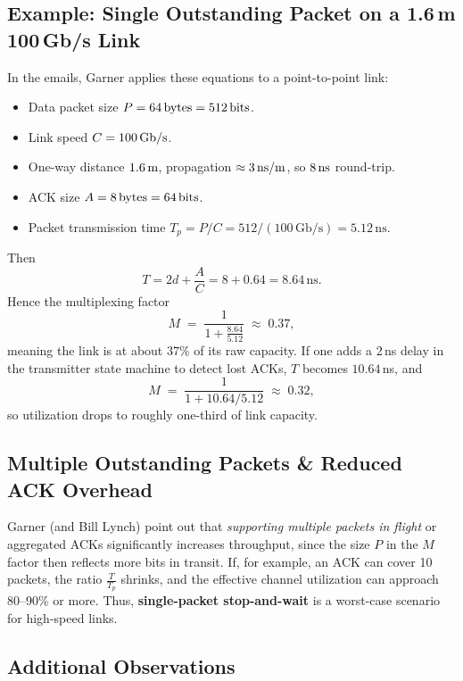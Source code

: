 \subsection{Example: Single Outstanding Packet on a 1.6\,m 100\,Gb/s Link}

In the emails, Garner applies these equations to a point-to-point link:
\begin{itemize}
\item Data packet size $P = 64\text{\,bytes} = 512\text{\,bits}$.
\item Link speed $C = 100\text{\,Gb/s}$.
\item One-way distance $1.6\text{\,m}$, propagation $\approx 3\text{\,ns/m}$, so $8\text{\,ns}$ round-trip.
\item ACK size $A = 8\text{\,bytes} = 64\text{\,bits}$.
\item Packet transmission time $T_p = P/C = 512 / (100\,\text{Gb/s}) = 5.12\,\text{ns}$.
\end{itemize}

Then
\[
  T = 2d + \frac{A}{C} = 8 + 0.64 = 8.64\,\text{ns}.
\]
Hence the multiplexing factor
\[
  M \;=\; \frac{1}{1 + \frac{8.64}{5.12}} \;\approx\; 0.37,
\]
meaning the link is at about $37\%$ of its raw capacity. If one adds a 2\,ns delay in the transmitter state machine to detect lost ACKs, $T$ becomes $10.64$\,ns, and
\[
  M \;=\; \frac{1}{1 + 10.64/5.12} \;\approx\; 0.32,
\]
so utilization drops to roughly one-third of link capacity.

\subsection{Multiple Outstanding Packets \& Reduced ACK Overhead}

Garner (and Bill Lynch) point out that \emph{supporting multiple packets in flight} or aggregated ACKs significantly increases throughput, since the size $P$ in the $M$ factor then reflects more bits in transit. If, for example, an ACK can cover 10 packets, the ratio $\frac{T}{T_p}$ shrinks, and the effective channel utilization can approach 80--90\% or more. Thus, \textbf{single-packet stop-and-wait} is a worst-case scenario for high-speed links.

\subsection{Additional Observations}

